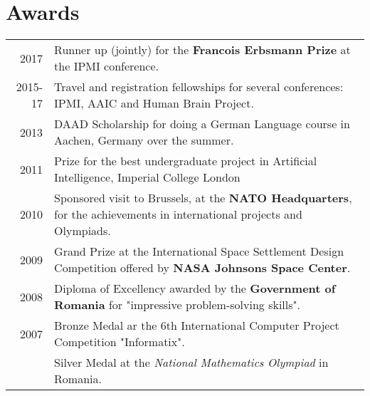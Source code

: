 \documentclass[a4paper,10pt]{article} %
\begin{document}

\section*{Awards}

\begin{tabular}{r|p{15.7cm}}
2017 & Runner up (jointly) for the \textbf{Francois Erbsmann Prize} at the IPMI conference.\\
2015-17 & Travel and registration fellowships for several conferences: IPMI, AAIC and Human Brain Project.\\
2013 & DAAD Scholarship for doing a German Language course in Aachen, Germany over the summer.\\
2011 & Prize for the best undergraduate project in Artificial Intelligence, Imperial College London\\
2010 & Sponsored visit to Brussels, at the \textbf{NATO Headquarters}, for the
achievements in international projects and Olympiads.\\
2009 & Grand Prize at the International Space Settlement Design Competition offered by \textbf{NASA Johnsons Space Center}.\\
2008 & Diploma of Excellency awarded by the \textbf{Government of Romania} for "impressive problem-solving skills".\\
2007 & Bronze Medal ar the 6th International Computer Project Competition
"Informatix".\\
& Silver Medal at the \emph{National Mathematics Olympiad} in Romania.
\end{tabular}

\end{document}
